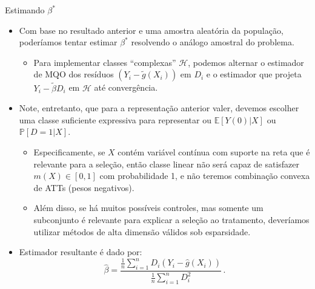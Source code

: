 \documentclass[11pt]{beamer}
\begin{document}
	\begin{frame}{Estimando $\beta^*$}
		\begin{itemize}
			\item Com base no resultado anterior e uma amostra aleatória da população, poderíamos tentar estimar $\beta^*$ resolvendo o análogo amostral do problema.
			\begin{itemize}
				\item Para implementar classes ``complexas'' $\mathcal{H}$, podemos alternar o estimador de MQO dos resíduos $(Y_i-\tilde{g}(X_i))$ em $D_i$ e o estimador que projeta $Y_i - \tilde{\beta} D_i$ em $\mathcal{H}$ até convergência.
			\end{itemize} 
			\item Note, entretanto, que para a representação anterior valer, devemos escolher uma classe suficiente expressiva para representar ou $\mathbb{E}[Y(0)|X]$ ou $\mathbb{P}[D=1|X]$.
			\begin{itemize}
				\item Especificamente, se $X$ contém variável contínua com suporte na reta que é relevante para a seleção, então classe linear não será capaz de satisfazer $m(X) \in [0,1]$ com probabilidade 1, e não teremos combinação convexa de ATTs (pesos negativos).
				\item Além disso, se há muitos possíveis controles, mas somente um subconjunto é relevante para explicar a seleção ao tratamento, deveríamos utilizar métodos de alta dimensão válidos sob esparsidade. 
			\end{itemize}
			\item Estimador resultante é dado por:
			\vspace{-0.5em}
			$$\hat{\beta} = \frac{ \frac{1}{n} \sum_{i=1}^nD_i (Y_i - \hat{g}(X_i))}{\frac{1}{n}\sum_{i=1}^n D_i^2}\, .$$
		\end{itemize}
	\end{frame}
	
\end{document}
